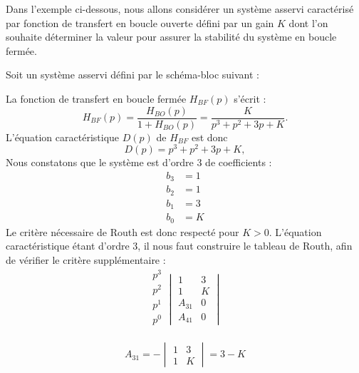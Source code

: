 Dans l'exemple ci-dessous, nous allons considérer un système asservi 
caractérisé par fonction de transfert en boucle ouverte défini par un gain $K$
dont l'on souhaite déterminer la valeur pour assurer la stabilité du système en 
boucle fermée.

Soit un système asservi défini par le schéma-bloc suivant :
\begin{center}
    
\end{center}
La fonction de transfert en boucle fermée $H_{BF}(p)$ s'écrit :
\[
    H_{BF}(p)=\dfrac{H_{BO}(p)}{1+H_{BO}(p)}=\dfrac{K}{p^3+p^2+3p+K}.
\]
L'équation caractéristique $D(p)$ de $H_{BF}$ est donc 
\[
    D(p)=p^3+p^2+3p+K,
\]
Nous constatons que le système est d'ordre 3 de coefficients :
\begin{align*}
    b_3&=1\\
    b_2&=1\\
    b_1&=3\\
    b_0&=K
\end{align*}
Le critère nécessaire de Routh est donc respecté pour $K>0$. L'équation 
caractéristique étant d'ordre 3, il nous faut construire le tableau de Routh, 
afin de vérifier le critère supplémentaire :
\[
\begin{matrix}
    p^3 \\
    p^2 \\
    \hline
    p^1 \\
    p^0 \\
\end{matrix}
\begin{vmatrix}
     1      & 3  \\
     1      & K  \\
    \hline
    A_{31}  & 0  \\
    A_{41}  & 0    
\end{vmatrix}
\]

\[
A_{31}=-\begin{vmatrix}1 & 3 \\ 1 & K\end{vmatrix}=3-K
\]

